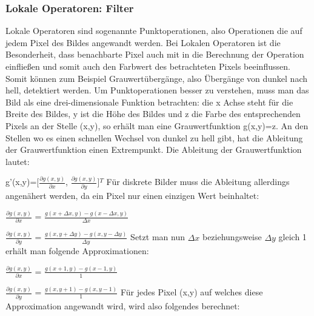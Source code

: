 \documentclass[12pt, a4paper]{article}
\begin{document}
\subsubsection{Lokale Operatoren: Filter}
Lokale Operatoren sind sogenannte Punktoperationen, also Operationen die auf jedem Pixel des Bildes angewandt werden. Bei Lokalen Operatoren ist die Besonderheit, dass benachbarte Pixel auch mit in die Berechnung der Operation einfließen und somit auch den Farbwert des betrachteten Pixels beeinflussen. Somit können zum Beispiel Grauwertübergänge, also Übergänge von dunkel nach hell, detektiert werden. Um Punktoperationen besser zu verstehen, muss man das Bild als eine drei-dimensionale Funktion betrachten: die x Achse steht für die Breite des Bildes, y ist die Höhe des Bildes und z die Farbe des entsprechenden Pixels an der Stelle (x,y), so erhält man eine Grauwertfunktion g(x,y)=z. An den Stellen wo es einen schnellen Wechsel von dunkel zu hell gibt, hat die Ableitung der Grauwertfunktion einen Extrempunkt. Die Ableitung der Grauwertfunktion lautet:
\newline

g'(x,y)=[$\frac{\partial g(x,y)}{\partial x}$, $\frac{\partial g(x,y)}{\partial y}$]$^T$
\newline
Für diskrete Bilder muss die Ableitung allerdings angenähert werden, da ein Pixel nur einen einzigen Wert beinhaltet:
\newline

$\frac{\partial g(x,y)}{\partial x}$ = $\frac{g(x+\Delta x,y)-g(x-\Delta x,y)}{\Delta x}$
\newline

$\frac{\partial g(x,y)}{\partial y}$ = $\frac{g(x,y+\Delta y)-g(x,y-\Delta y)}{\Delta y}$
\newline
Setzt man nun $\Delta x$ beziehungsweise $\Delta y$ gleich 1 erhält man folgende Approximationen:
\newline

$\frac{\partial g(x,y)}{\partial x}$ = $\frac{g(x+1,y)-g(x-1,y)}{1}$
\newline

$\frac{\partial g(x,y)}{\partial y}$ = $\frac{g(x,y+1)-g(x,y-1)}{1}$
\newline
Für jedes Pixel (x,y) auf welches diese Approximation angewandt wird, wird also folgendes berechnet:
\newline
\end{document}
